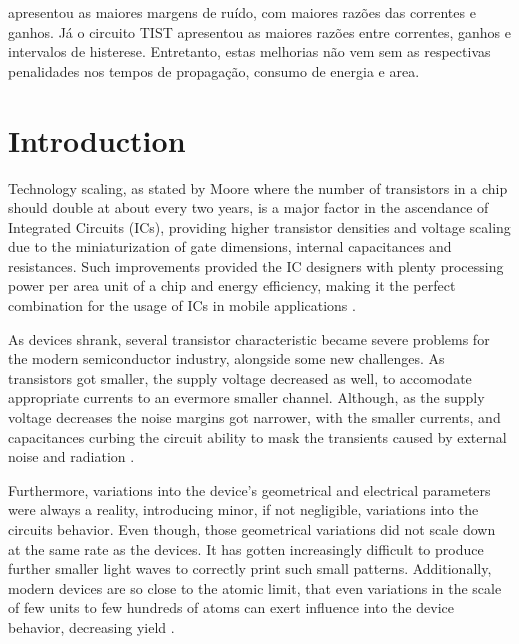\documentclass[diss,pgmicro,english]{iiufrgs}
\begin{document}
\begin{englishabstract}
{apresentou as maiores margens de ruído, com maiores razões das correntes e ganhos. Já o circuito TIST apresentou as maiores razões entre correntes, ganhos e intervalos de histerese. Entretanto, estas melhorias não vem sem as respectivas penalidades nos tempos de propagação, consumo de energia e area.

}
\end{englishabstract}

\tableofcontents

\chapter{Introduction}
	Technology scaling, as stated by Moore where the number of transistors in a chip should double at about every two years, is a major factor in the ascendance of Integrated Circuits (ICs), providing higher transistor densities and voltage scaling due to the miniaturization of gate dimensions, internal capacitances and resistances. Such improvements provided the IC designers with plenty processing power per area unit of a chip and energy efficiency, making it the perfect combination for the usage of ICs in mobile applications \cite{islam:10}.

	As devices shrank, several transistor characteristic became severe problems for the modern semiconductor industry, alongside some new challenges. As transistors got smaller, the supply voltage decreased as well, to accomodate appropriate currents to an evermore smaller channel. Although, as the supply voltage decreases the noise margins got narrower, with the smaller currents, and capacitances curbing the circuit ability to mask the transients caused by external noise and radiation \cite{abbas:15}.

	Furthermore, variations into the device's geometrical and electrical parameters were always a reality, introducing minor, if not negligible, variations into the circuits behavior. Even though, those geometrical variations did not scale down at the same rate as the devices. It has gotten increasingly difficult to produce further smaller light waves to correctly print such small patterns. Additionally, modern devices are so close to the atomic limit, that even variations in the scale of few units to few hundreds of atoms can exert influence into the device behavior, decreasing yield \cite{abbas:15}.
\end{document}

